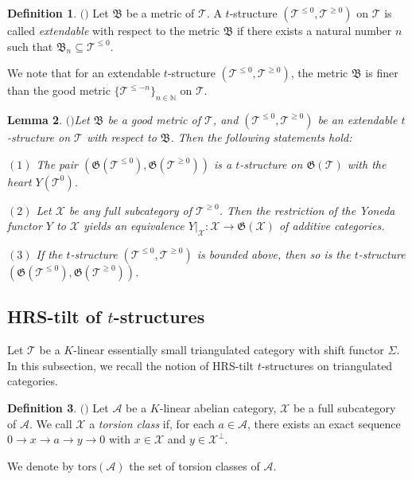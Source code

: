 \documentclass[11pt,a4paper]{amsart}
\numberwithin{equation}{section} \theoremstyle{plain}
\newtheorem{lem}{Lemma}[section]
\numberwithin{equation}{section} \theoremstyle{definition}
\newtheorem{definition}[lem]{Definition}
\newenvironment{df}{\begin{definition}\rm}{\end{definition}}
\begin{document}
\begin{df}$($\cite[Definition 3.2]{BCRPZ}$)$ Let $\mathfrak{B}$ be a metric of $\mathcal{T}$. A $t$-structure $(\mathcal{T}^{\leq0},\mathcal{T}^{\geq0})$ on $\mathcal{T}$ is called \emph{extendable} with respect to the metric $\mathfrak{B}$ if there exists a natural number $n$ such that $\mathfrak{B}_{n}\subseteq\mathcal{T}^{\leq0}$.
\end{df}
We note that for an extendable $t$-structure $(\mathcal{T}^{\leq0},\mathcal{T}^{\geq0})$, the metric $\mathfrak{B}$ is finer than the good metric $\{\mathcal{T}^{\leq-n}\}_{n\in\mathbb{N}}$ on $\mathcal{T}$.

\begin{lem}$($\cite[Theorem 3.5]{BCRPZ}$)$\label{thm2} Let $\mathfrak{B}$ be a good metric of $\mathcal{T}$, and $(\mathcal{T}^{\leq0},\mathcal{T}^{\geq0})$ be an extendable $t$-structure on $\mathcal{T}$ with respect to $\mathfrak{B}$. Then the following statements hold:

$(1)$ The pair $(\mathfrak{G}(\mathcal{T}^{\leq0}),\mathfrak{G}(\mathcal{T}^{\geq0}))$ is a $t$-structure on $\mathfrak{G}(\mathcal{T})$ with the heart $Y(\mathcal{T}^{0})$.

$(2)$ Let $\mathcal{X}$ be any full subcategory of $\mathcal{T}^{\geq0}$. Then the restriction of the Yoneda functor $Y$ to $\mathcal{X}$ yields an equivalence $Y|_{\mathcal{X}}:\mathcal{X}\rightarrow\mathfrak{G}(\mathcal{X})$ of additive categories.

$(3)$ If the $t$-structure $(\mathcal{T}^{\leq0},\mathcal{T}^{\geq0})$ is bounded above, then so is the $t$-structure $(\mathfrak{G}(\mathcal{T}^{\leq0}),\mathfrak{G}(\mathcal{T}^{\geq0}))$.
\end{lem}

\subsection{HRS-tilt of $t$-structures}
\noindent

Let $\mathcal{T}$ be a $K$-linear essentially small triangulated category with shift functor $\Sigma$. In this subsection, we recall the notion of HRS-tilt $t$-structures on triangulated categories.

\begin{df}$($\cite{D}$)$ Let $\mathcal{A}$ be a $K$-linear abelian category, $\mathcal{X}$ be a full subcategory of $\mathcal{A}$. We call $\mathcal{X}$ a \emph{torsion class} if, for each $a\in\mathcal{A}$, there exists an exact sequence $0\rightarrow x\rightarrow a\rightarrow y\rightarrow0$ with $x\in\mathcal{X}$ and $y\in\mathcal{X}^{\perp}$.

We denote by $\mathrm{tors}(\mathcal{A})$ the set of torsion classes of $\mathcal{A}$.
\end{df}
\end{document}

